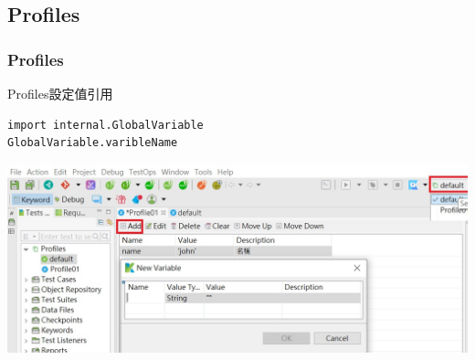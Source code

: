 \documentclass{beamer}
\begin{document}
\subsection{Profiles}
\begin{frame}[fragile]
    \frametitle{Profiles}
    \begin{block}{Profiles設定值引用}
\begin{lstlisting}
import internal.GlobalVariable
GlobalVariable.varibleName
\end{lstlisting}
    \end{block}
    \includegraphics[width=1\textwidth]{picture/Profile新增數值.jpg}
\end{frame}
\label{objectRepository}
\end{document}
